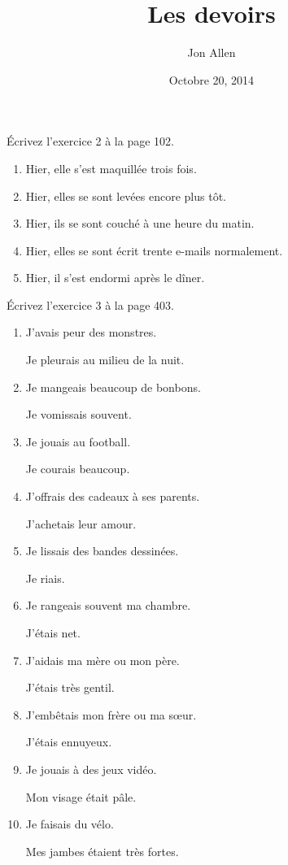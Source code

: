 \documentclass[letterpaper]{article}
\begin{document}
\title{Les devoirs}
\date{Octobre 20, 2014}
\author{Jon Allen}
\maketitle
Écrivez l'exercice 2 à la page 102.
\begin{enumerate}
\item
Hier, elle s'est maquillée trois fois.
\item
Hier, elles se sont levées encore plus tôt.
\item
Hier, ils se sont couché à une heure du matin.
\item
Hier, elles se sont écrit trente e-mails normalement.
\item
Hier, il s'est endormi après le dîner.
\end{enumerate}

Écrivez l'exercice 3 à la page 403.
\begin{enumerate}
\item
J'avais peur des monstres.

Je pleurais au milieu de la nuit.
\item
Je mangeais beaucoup de bonbons.

Je vomissais souvent.
\item
Je jouais au football.

Je courais beaucoup.
\item
J'offrais des cadeaux à ses parents.

J'achetais leur amour.
\item
Je lissais des bandes dessinées.

Je riais.
\item
Je rangeais souvent ma chambre.

J'étais net.
\item
J'aidais ma mère ou mon père.

J'étais très gentil.
\item
J'embêtais mon frère ou ma sœur.

J'étais ennuyeux.
\item
Je jouais à des jeux vidéo.

Mon visage était pâle.
\item
Je faisais du vélo.

Mes jambes étaient très fortes.
\end{enumerate}
\end{document}
